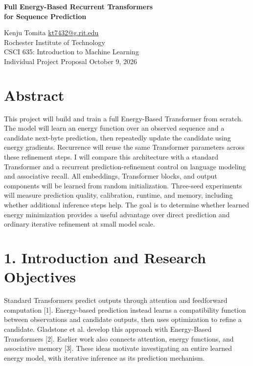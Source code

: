 \documentclass[11pt,letterpaper]{article}
\begin{document}
\begin{center}
{\Large\bfseries Full Energy-Based Recurrent Transformers\\for Sequence Prediction}\par
\vspace{3pt}
Kenju Tomita \quad \href{mailto:kt7432@g.rit.edu}{kt7432@g.rit.edu}\\
Rochester Institute of Technology\\
CSCI 635: Introduction to Machine Learning\\
Individual Project Proposal \quad October 9, 2026
\end{center}

\section*{Abstract}

This project will build and train a full Energy-Based Transformer from scratch. The model will learn an energy function over an observed sequence and a candidate next-byte prediction, then repeatedly update the candidate using energy gradients. Recurrence will reuse the same Transformer parameters across these refinement steps. I will compare this architecture with a standard Transformer and a recurrent prediction-refinement control on language modeling and associative recall. All embeddings, Transformer blocks, and output components will be learned from random initialization. Three-seed experiments will measure prediction quality, calibration, runtime, and memory, including whether additional inference steps help. The goal is to determine whether learned energy minimization provides a useful advantage over direct prediction and ordinary iterative refinement at small model scale.

\section*{1. Introduction and Research Objectives}

Standard Transformers predict outputs through attention and feedforward computation [1]. Energy-based prediction instead learns a compatibility function between observations and candidate outputs, then uses optimization to refine a candidate. Gladstone et al. develop this approach with Energy-Based Transformers [2]. Earlier work also connects attention, energy functions, and associative memory [3]. These ideas motivate investigating an entire learned energy model, with iterative inference as its prediction mechanism.
\end{document}
